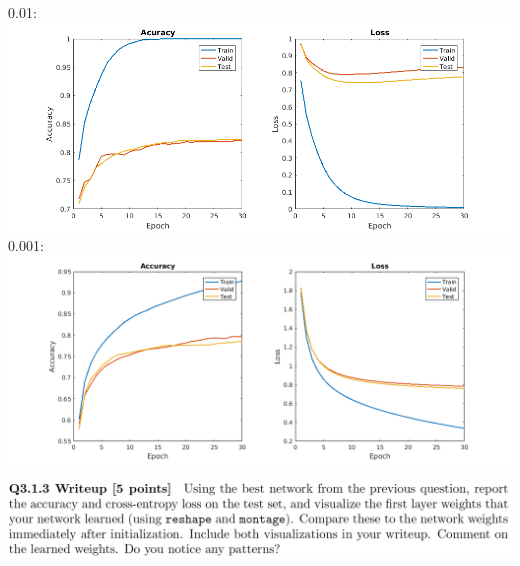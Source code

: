 \documentclass[12pt,letterpaper,boxed]{hmcpset}
\begin{document}
\begin{solution}
0.01:\\
\includegraphics[width=\textwidth]{3_1_2_11.png}\\
0.001:\\
\includegraphics[width=\textwidth]{3_2_1_11.png}


\end{solution}
\newpage

\begin{problem}[]
\includegraphics[width=\textwidth]{3_1_3.png}
\end{problem}
\end{document}
